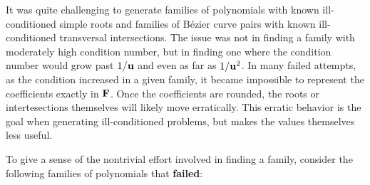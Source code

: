It was quite challenging to generate families of polynomials with known
ill-conditioned simple roots and families of B\'{e}zier curve pairs with known
ill-conditioned transversal intersections. The issue was not in finding a
family with moderately high condition number, but in finding one where the
condition number would grow past \(1 / \mathbf{u}\) and even as far as
\(1 / \mathbf{u}^2\). In many failed attempts, as the condition increased
in a given family, it became impossible to represent the
coefficients exactly in \(\mathbf{F}\). Once the coefficients are rounded,
the roots or intertesections themselves will likely move erratically.
This erratic behavior is the goal when generating ill-conditioned problems,
but makes the values themselves less useful.

To give a sense of the nontrivial effort involved in finding a
family, consider the following families of polynomials that
\textbf{failed}:
